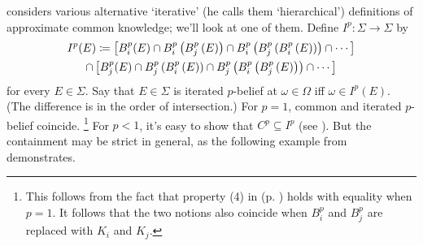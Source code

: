 \documentclass[11pt,letterpaper,reqno,oneside]{article}
\begin{document}
\textcite{Morris1999} considers various alternative `iterative' (he calls them `hierarchical') definitions of approximate common knowledge; we'll look at one of them. Define $I^p : \Sigma \to \Sigma$ by
%
\begin{multline*}
	I^p(E)
	\coloneqq \left[ B^p_i(E) 
	\cap B^p_i \left( B^p_j \left( E \right) \right)
	\cap B^p_i \left( B^p_j \left( B^p_i \left( E \right) \right) \right) 
	\cap \cdots \right]
	\\
	\cap
	\left[ B^p_j(E) 
	\cap B^p_j \left( B^p_i \left( E \right) \right)
	\cap B^p_j \left( B^p_i \left( B^p_j \left( E \right) \right) \right) 
	\cap \cdots \right] 
\end{multline*}
%
for every $E \in \Sigma$. Say that $E \in \Sigma$ is iterated $p$-belief at $\omega \in \Omega$ iff $\omega \in I^p(E)$. (The difference is in the order of intersection.) For $p=1$, common and iterated $p$-belief coincide.%
	\footnote{This follows from the fact that property (4) in  (p. \pageref{proposition:MS_Bp_properties}) holds with equality when $p=1$. It follows that the two notions also coincide when $B^p_i$ and $B^p_j$ are replaced with $K_i$ and $K_j$.}
For $p<1$, it's easy to show that $C^p \subseteq I^p$ (see \textcite[][Lemma 14]{Morris1999}). But the containment may be strict in general, as the following example from \textcite{Morris1999} demonstrates.
%
\end{document}
